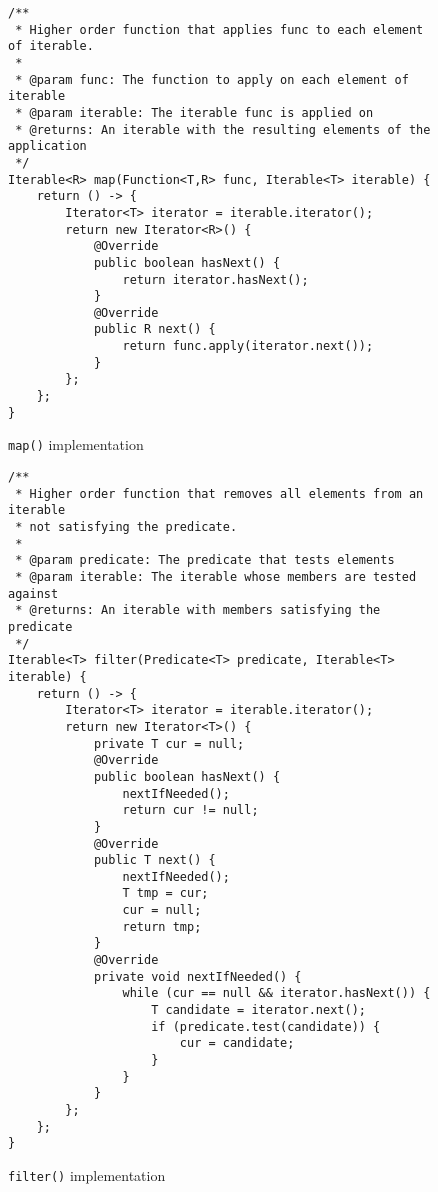 \documentclass[abstracton,12pt]{scrartcl}
\theoremstyle{definition}
\begin{document}
\begin{figure}
  \centering
\begin{verbatim}
/**
 * Higher order function that applies func to each element of iterable.
 *
 * @param func: The function to apply on each element of iterable
 * @param iterable: The iterable func is applied on
 * @returns: An iterable with the resulting elements of the application
 */
Iterable<R> map(Function<T,R> func, Iterable<T> iterable) {
    return () -> {
        Iterator<T> iterator = iterable.iterator();
        return new Iterator<R>() {
            @Override
            public boolean hasNext() {
                return iterator.hasNext();
            }
            @Override
            public R next() {
                return func.apply(iterator.next());
            }
        };
    };
}
\end{verbatim}
  \caption{\texttt{map()} implementation}
  \label{fig:java_map}
\end{figure}

\begin{figure}
  \centering
\begin{verbatim}
/**
 * Higher order function that removes all elements from an iterable
 * not satisfying the predicate.
 *
 * @param predicate: The predicate that tests elements
 * @param iterable: The iterable whose members are tested against
 * @returns: An iterable with members satisfying the predicate
 */
Iterable<T> filter(Predicate<T> predicate, Iterable<T> iterable) {
    return () -> {
        Iterator<T> iterator = iterable.iterator();
        return new Iterator<T>() {
            private T cur = null;
            @Override
            public boolean hasNext() {
                nextIfNeeded();
                return cur != null; 
            }
            @Override
            public T next() {
                nextIfNeeded();
                T tmp = cur;
                cur = null;
                return tmp;
            }
            @Override
            private void nextIfNeeded() {
                while (cur == null && iterator.hasNext()) {
                    T candidate = iterator.next();
                    if (predicate.test(candidate)) {
                        cur = candidate;
                    }
                }
            }
        };
    };
}
\end{verbatim}
  \caption{\texttt{filter()} implementation}
  \label{fig:java_filter}
\end{figure}

\newpage



\end{document}
